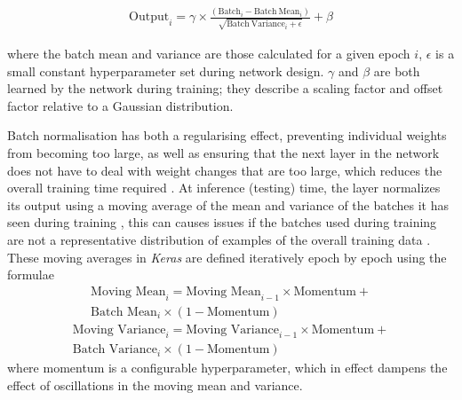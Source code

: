 \begin{equation}
    \begin{split}
        \textrm{Output}_i = \gamma \times \frac{(\mathrm{Batch}_i-\mathrm{Batch\  Mean}_i)}{\sqrt{\mathrm{Batch\ Variance}_i+\epsilon}}+\beta
    \end{split}
\label{eq:batchnorm}
\end{equation}

where the batch mean and variance are those calculated for a given epoch $i$, $\epsilon$ is a small constant hyperparameter set during network design. $\gamma$ and $\beta$ are both learned by the network during training; they describe a scaling factor and offset factor relative to a Gaussian distribution. 

Batch normalisation has both a regularising effect, preventing individual weights from becoming too large, as well as ensuring that the next layer in the network does not have to deal with weight changes that are too large, which reduces the overall training time required \cite{tdsbatch}. At inference (testing) time, the layer normalizes its output using a moving average of the mean and variance of the batches it has seen during training \cite{Keras}, this can causes issues if the batches used during training are not a representative distribution of examples of the overall training data \cite{tdsbatch}. These moving averages in \textit{Keras} are defined iteratively epoch by epoch using the formulae
\newline
\begin{equation}
    \begin{split}
    \textrm{Moving Mean}_i=\textrm{Moving Mean}_{i-1}\times \textrm{Momentum} +\\ \textrm{Batch Mean}_i \times (1-\textrm{Momentum})
    \end{split}
    \label{eq:movingav}
\end{equation}
\begin{equation}
    \begin{split}
    \textrm{Moving Variance}_i=\textrm{Moving Variance}_{i-1}\times \textrm{Momentum} +\\ \textrm{Batch Variance}_i \times (1-\textrm{Momentum})
    \end{split}
    \label{eq:movingstd}
\end{equation}
\newline
where momentum is a configurable hyperparameter, which in effect dampens the effect of oscillations in the moving mean and variance.

